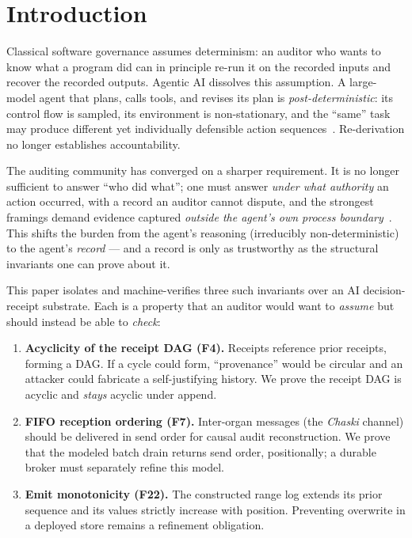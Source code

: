 \documentclass[11pt,letterpaper]{article}
\theoremstyle{definition}
\begin{document}
\section{Introduction}\label{sec:intro}

Classical software governance assumes determinism: an auditor who wants to know
what a program did can in principle re-run it on the recorded inputs and
recover the recorded outputs. Agentic AI dissolves this assumption. A
large-model agent that plans, calls tools, and revises its plan is
\emph{post-deterministic}: its control flow is sampled, its environment is
non-stationary, and the ``same'' task may produce different yet individually
defensible action sequences~\cite{brundage2020}. Re-derivation no longer
establishes accountability.

The auditing community has converged on a sharper requirement. It is no longer
sufficient to answer ``who did what''; one must answer \emph{under what
authority} an action occurred, with a record an auditor cannot dispute, and the
strongest framings demand evidence captured \emph{outside the agent's own
process boundary}~\cite{isaca2025,armo2025}. This shifts the burden from the
agent's reasoning (irreducibly non-deterministic) to the agent's
\emph{record} --- and a record is only as trustworthy as the structural
invariants one can prove about it.

This paper isolates and machine-verifies three such invariants over an AI
decision-receipt substrate. Each is a property that an auditor would want to
\emph{assume} but should instead be able to \emph{check}:

\begin{enumerate}
\item \textbf{Acyclicity of the receipt DAG (F4).} Receipts reference prior
  receipts, forming a DAG. If a cycle could form, ``provenance'' would be
  circular and an attacker could fabricate a self-justifying history. We prove
  the receipt DAG is acyclic and \emph{stays} acyclic under append.
\item \textbf{FIFO reception ordering (F7).} Inter-organ messages (the
  \emph{Chaski} channel) should be delivered in send order for causal audit
  reconstruction. We prove that the modeled batch drain returns send order,
  positionally; a durable broker must separately refine this model.
\item \textbf{Emit monotonicity (F22).} The constructed range log extends its
  prior sequence and its values strictly increase with position. Preventing
  overwrite in a deployed store remains a refinement obligation.
\end{enumerate}
\end{document}
